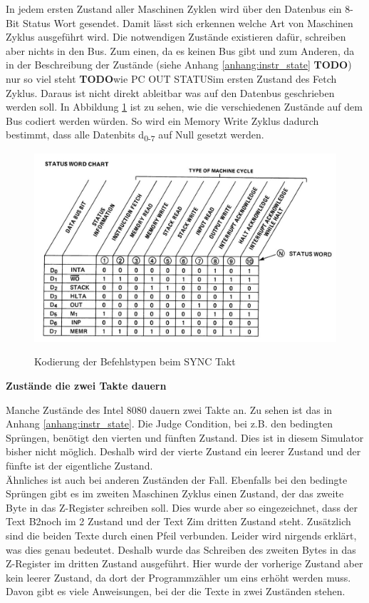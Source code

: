 \documentclass[12pt]{article}
\newcommand{\imgSpaceBefore}{\\[0.2cm]}
\newcommand{\todo}{\textbf{TODO}}
\begin{document}
\noindent
In jedem ersten Zustand aller Maschinen Zyklen wird über den Datenbus ein 8-Bit Status Wort gesendet. Damit lässt sich erkennen welche Art von Maschinen Zyklus ausgeführt wird. 
Die notwendigen Zustände existieren dafür, schreiben aber nichts in den Bus. Zum einen, da es keinen Bus gibt und zum Anderen, da in der Beschreibung der Zustände (siehe Anhang \ref{anhang:instr_state} \textbf{TODO}) nur so viel steht \todo wie \glqq PC OUT STATUS\grqq im ersten Zustand des Fetch Zyklus. Daraus ist nicht direkt ableitbar was auf den Datenbus geschrieben werden soll. In Abbildung \ref{fig:status_word} ist zu sehen, wie die verschiedenen Zustände auf dem Bus codiert werden würden. So wird ein Memory Write Zyklus dadurch bestimmt, dass alle Datenbits d\textsubscript{0-7} auf Null gesetzt werden.
\imgSpaceBefore
\begin{figure}[H]
\caption{Kodierung der Befehlstypen beim SYNC Takt}
\centering
\includegraphics[width=15cm]{Bilder/Intel8080_DataLines}
\label{fig:status_word}
\end{figure}

\noindent
\textbf{Zustände die zwei Takte dauern}

\noindent
Manche Zustände des Intel 8080 dauern zwei Takte an. Zu sehen ist das in Anhang \ref{anhang:instr_state}. Die Judge Condition, bei z.B. den bedingten Sprüngen, benötigt den vierten und fünften Zustand. Dies ist in diesem Simulator bisher nicht möglich. Deshalb 
wird der vierte Zustand ein leerer Zustand und der fünfte ist der eigentliche Zustand. 
\\

\noindent
Ähnliches ist auch bei anderen Zuständen der Fall. Ebenfalls bei den bedingte Sprüngen gibt es im zweiten Maschinen Zyklus einen Zustand, der das zweite Byte in das Z-Register schreiben soll. Dies wurde aber so eingezeichnet, dass der Text \glqq B2\grqq noch im 2 Zustand und der Text \glqq Z\grqq im dritten Zustand steht. Zusätzlich sind die beiden Texte durch einen Pfeil verbunden. Leider wird nirgends erklärt, was dies genau bedeutet. Deshalb wurde das Schreiben des zweiten Bytes in das Z-Register im dritten Zustand ausgeführt. Hier wurde der vorherige Zustand aber kein leerer Zustand, da dort der Programmzähler um eins erhöht werden muss. Davon gibt es viele Anweisungen, bei der die Texte in zwei Zuständen stehen.
\\
\end{document}

